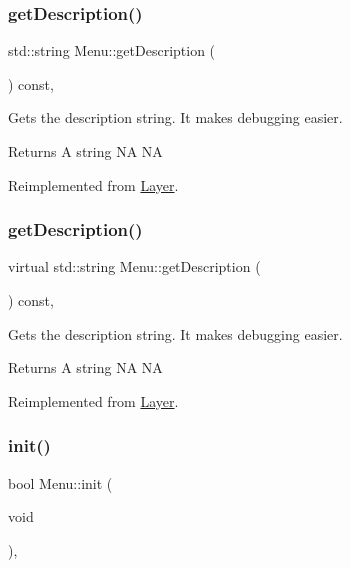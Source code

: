 \subsubsection{\texorpdfstring{get\+Description()}{getDescription()}\hspace{0.1cm}{\footnotesize\ttfamily [1/2]}}
{\footnotesize\ttfamily std\+::string Menu\+::get\+Description (\begin{DoxyParamCaption}{ }\end{DoxyParamCaption}) const\hspace{0.3cm}{\ttfamily [override]}, {\ttfamily [virtual]}}

Gets the description string. It makes debugging easier. \begin{DoxyReturn}{Returns}
A string  NA  NA 
\end{DoxyReturn}


Reimplemented from \hyperlink{classLayer_acadcdf383e0bf892c95213a4f7725672}{Layer}.

\mbox{\label{classMenu_ac8ea6b6d3296f7c973e1d82051425afe}} 
\subsubsection{\texorpdfstring{get\+Description()}{getDescription()}\hspace{0.1cm}{\footnotesize\ttfamily [2/2]}}
{\footnotesize\ttfamily virtual std\+::string Menu\+::get\+Description (\begin{DoxyParamCaption}{ }\end{DoxyParamCaption}) const\hspace{0.3cm}{\ttfamily [override]}, {\ttfamily [virtual]}}

Gets the description string. It makes debugging easier. \begin{DoxyReturn}{Returns}
A string  NA  NA 
\end{DoxyReturn}


Reimplemented from \hyperlink{classLayer_acadcdf383e0bf892c95213a4f7725672}{Layer}.

\mbox{\label{classMenu_a64390e993f1abcf27799a2217a94dd38}} 
\subsubsection{\texorpdfstring{init()}{init()}\hspace{0.1cm}{\footnotesize\ttfamily [1/2]}}
{\footnotesize\ttfamily bool Menu\+::init (\begin{DoxyParamCaption}\item[{void}]{ }\end{DoxyParamCaption})\hspace{0.3cm}{\ttfamily [override]}, {\ttfamily [virtual]}}

